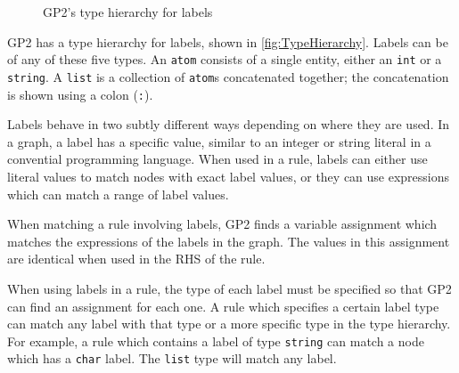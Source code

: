 \documentclass[authoryearcitations]{UoYCSproject}
\begin{document}
\begin{figure}
    \begin{framed}
    \begin{center}
    \end{center}
    \end{framed}
    \caption{GP2's type hierarchy for labels}
    \label{fig:TypeHierarchy}
\end{figure}

GP2 has a type hierarchy for labels, shown in \autoref{fig:TypeHierarchy}. Labels
can be of any of these five types. An \texttt{atom} consists of a single entity,
either an \texttt{int} or a \texttt{string}. A \texttt{list} is a collection of
\texttt{atom}s concatenated together; the concatenation is shown using a colon
(\texttt{:}).

Labels behave in two subtly different ways depending on where they are used. In a
graph, a label has a specific value, similar to an integer or string literal in a
convential programming language. When used in a rule, labels can either use literal
values to match nodes with exact label values, or they can use expressions which
can match a range of label values.

When matching a rule involving labels, GP2 finds a variable assignment which
matches the expressions of the labels in the graph. The values in this assignment
are identical when used in the RHS of the rule.

When using labels in a rule, the type of each label must be specified so that GP2
can find an assignment for each one. A rule which specifies a certain label type
can match any label with that type or a more specific type in the type hierarchy.
For example, a rule which contains a label of type \texttt{string} can match a
node which has a \texttt{char} label. The \texttt{list} type will match any label.
\end{document}
